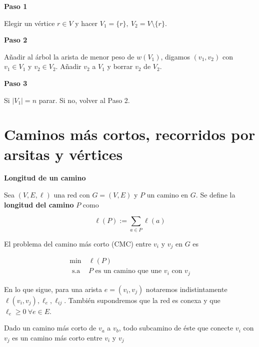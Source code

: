 \documentclass[openany]{book}
\begin{document}
\begin{center}
  \textbf{Paso 1}

\end{center}

    Elegir un vértice $ r \in V $ y hacer $ V_1 = \{r\},\ V_2 = V \setminus \{r\} $.

\begin{center}
  \textbf{Paso 2}
\end{center}

    Añadir al árbol la arista de menor peso de $ w(V_1) $, digamos $ (v_1,v_2) $ con $ v_1 \in V_1 $ y $ v_2 \in V_2 $. Añadir $ v_2  $ a $ V_1 $ y borrar $ v_2  $ de $ V_2 $.

\begin{center}
  \textbf{Paso 3}

\end{center}

    Si $ |V_1| = n $ parar. Si no, volver al Paso 2.

\chapter{Caminos más cortos, recorridos por arsitas y vértices}


\begin{definition}
  { \color{turquoise} \textbf{Longitud de un camino}}

  Sea $(V, E, \ell)$ una red con $G=(V, E)$ y $P$ un camino en $G$. Se define la \textbf{longitud del camino} $P$ como

  $$
  \ell(P):=\sum_{a \in P} \ell(a)
  $$

\end{definition}

El problema del camino más corto (CMC) entre $v_{i}$ y $v_{j}$ en $G$ es

$$
\begin{aligned}
\min\ & \ell(P) \\
\text { s.a } & P \text { es un camino que une } v_{i} \text { con } v_{j}
\end{aligned}
$$

En lo que sigue, para una arista $e=\left(v_{i}, v_{j}\right)$ notaremos indistintamente $\ell\left(v_{i}, v_{j}\right), \ell_{e}, \ell_{i j} .$ También supondremos que la red es conexa y que $\ell_{e} \geq 0\ \forall e \in E$.

\begin{proposition}
  Dado un camino más corto de $v_{a}$ a $v_{b}$, todo subcamino de éste que conecte $v_{i}$ con $v_{j}$ es un camino más corto entre $v_{i}$ y $v_{j}$

\end{proposition}
\end{document}
